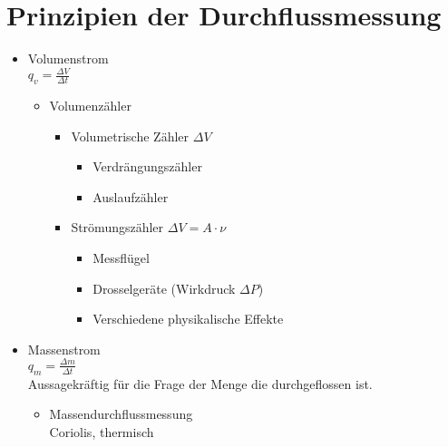 \section{Prinzipien der Durchflussmessung}
\begin{itemize}
\item Volumenstrom\\
$q_v= \frac{\Delta V}{\Delta t}$
\begin{itemize}
\item Volumenzähler
\begin{itemize}
\item Volumetrische Zähler $\Delta V$
\begin{itemize}
\item Verdrängungszähler
\item Auslaufzähler
\end{itemize}
\item Strömungszähler $\Delta V = A \cdot \nu$
\begin{itemize}
\item Messflügel
\item Drosselgeräte (Wirkdruck $\Delta P$)
\item Verschiedene physikalische Effekte
\end{itemize}
\end{itemize}
\end{itemize}
\item Massenstrom\\
$q_m = \frac{\Delta m}{\Delta t}$\\
Aussagekräftig für die Frage der Menge die durchgeflossen ist.
\begin{itemize}
\item Massendurchflussmessung\\
Coriolis, thermisch
\end{itemize}
\end{itemize}

